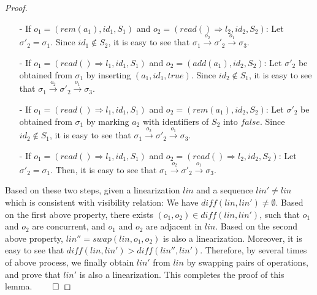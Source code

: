 {\begin {proof}
\begin{itemize}
\begin{itemize}
    \item[-] If $o_1 = (\mathit{rem}(a_1),\mathit{id}_1,S_1)$ and $o_2 = (\mathit{read}() \Rightarrow l_2,\mathit{id}_2,S_2)$: Let $\sigma'_2 = \sigma_1$. Since $\mathit{id}_1 \notin S_2$, it is easy to see that $\sigma_1 {\xrightarrow{o_2}} \sigma'_2 {\xrightarrow{o_1}} \sigma_3$.

    \item[-] If $o_1 = (\mathit{read}() \Rightarrow l_1,\mathit{id}_1,S_1)$ and $o_2 = (\mathit{add}(a_1),\mathit{id}_2,S_2)$: Let $\sigma'_2$ be obtained from $\sigma_1$ by inserting $(a_1,\mathit{id}_1,\mathit{true})$. Since $\mathit{id}_2 \notin S_1$, it is easy to see that $\sigma_1 {\xrightarrow{o_2}} \sigma'_2 {\xrightarrow{o_1}} \sigma_3$.

    \item[-] If $o_1 = (\mathit{read}() \Rightarrow l_1,\mathit{id}_1,S_1)$ and $o_2 = (\mathit{rem}(a_1),\mathit{id}_2,S_2)$: Let $\sigma'_2$ be obtained from $\sigma_1$ by marking $a_2$ with identifiers of $S_2$ into $\mathit{false}$. Since $\mathit{id}_2 \notin S_1$, it is easy to see that $\sigma_1 {\xrightarrow{o_2}} \sigma'_2 {\xrightarrow{o_1}} \sigma_3$.

    \item[-] If $o_1 = (\mathit{read}() \Rightarrow l_1,\mathit{id}_1,S_1)$ and $o_2 = (\mathit{read}() \Rightarrow l_2,\mathit{id}_2,S_2)$: Let $\sigma'_2 = \sigma_1$. Then, it is easy to see that $\sigma_1 {\xrightarrow{o_2}} \sigma'_2 {\xrightarrow{o_1}} \sigma_3$.
    \end{itemize}
\end{itemize}

Based on these two steps, given a linearization $\mathit{lin}$ and a sequence $\mathit{lin}' \neq \mathit{lin}$ which is consistent with visibility relation: We have $\mathit{diff}(\mathit{lin},\mathit{lin}') \neq \emptyset$. Based on the first above property, there exists $(o_1,o_2) \in \mathit{diff}(\mathit{lin},\mathit{lin}')$, such that $o_1$ and $o_2$ are concurrent, and $o_1$ and $o_2$ are adjacent in $\mathit{lin}$. Based on the second above property, $\mathit{lin}'' = \mathit{swap}(\mathit{lin},o_1,o_2)$ is also a linearization. Moreover, it is easy to see that $\mathit{diff}(\mathit{lin},\mathit{lin}') > \mathit{diff}(\mathit{lin}'',\mathit{lin}')$. Therefore, by several times of above process, we finally obtain $\mathit{lin}'$ from $\mathit{lin}$ by swapping pairs of operations, and prove that $\mathit{lin}'$ is also a linearization. This completes the proof of this lemma. $\qed$
\end {proof}



}
